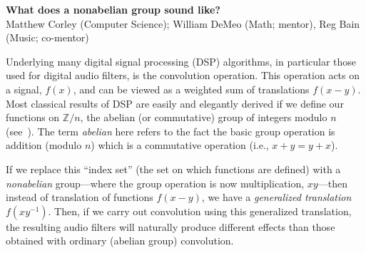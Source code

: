\documentclass[10pt]{article}
\begin{document}
\begin{center}
{\bf What does a nonabelian group sound like?}\\
Matthew Corley (Computer Science); William DeMeo (Math; mentor), Reg
Bain (Music; co-mentor)
\end{center}

Underlying many digital signal processing (DSP) algorithms, in particular those
used for digital audio filters, is the convolution operation.  This operation
acts on a signal, $f(x)$, and can be viewed as a weighted sum of translations
$f(x-y)$. Most classical results of DSP are easily and elegantly derived if we
define our functions on $\mathbb{Z}/n$, the abelian (or commutative) group of
integers modulo $n$ (see~\cite{Tolimieri:1998}).
  The term \emph{abelian} here refers to the fact the basic
group operation is addition (modulo $n$) which is a commutative operation (i.e.,
$x+y = y+x$).

If we replace this ``index set'' (the set on which functions are defined) with a
\emph{nonabelian} group---where the group operation is now multiplication,
$xy$---then instead of translation of 
functions $f(x-y)$, we have a \emph{generalized translation} $f(xy^{-1})$.
Then, if we carry out convolution using this generalized translation, the
resulting audio filters will naturally produce different effects than those
obtained with ordinary (abelian group) convolution.  
\end{document}
